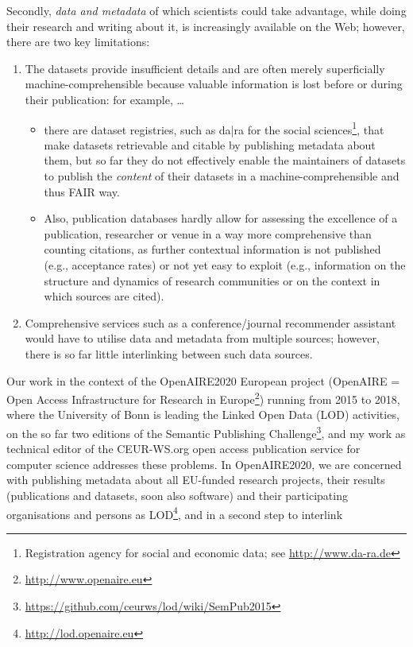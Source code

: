 \documentclass[a4paper,UKenglish]{dagrep}
\begin{document}
Secondly, \emph{data and metadata} of which scientists could take advantage,
while doing their research and writing about it, is increasingly available on
the Web; however, there are two key limitations:
\begin{enumerate}
\item The datasets provide insufficient details and are often merely
superficially machine-comprehensible because valuable information is lost before
or during their publication: for example, …
  \begin{itemize}
  \item there are dataset registries, such as da|ra for the social
sciences\footnote{Registration agency for social and economic data; see
\url{http://www.da-ra.de}}, that make datasets retrievable and citable by
publishing metadata about them, but so far they do not effectively enable the
maintainers of datasets to publish the \emph{content} of their datasets in a
machine-comprehensible and thus FAIR way.
  \item Also, publication databases hardly allow for assessing the excellence of
a publication, researcher or venue in a way more comprehensive than counting
citations, as further contextual information is not published (e.g., acceptance
rates) or not yet easy to exploit (e.g., information on the structure and
dynamics of research communities or on the context in which sources are cited).
  \end{itemize}
\item Comprehensive services such as a conference/journal recommender assistant
would have to utilise data and metadata from multiple sources; however, there is
so far little interlinking between such data sources.
\end{enumerate}
Our work in the context of the OpenAIRE2020 European project (OpenAIRE = Open
Access Infrastructure for Research in
Europe\footnote{\url{http://www.openaire.eu}}) running from 2015 to 2018, where
the University of Bonn is leading the Linked Open Data (LOD) activities, on the
so far two editions of the Semantic Publishing
Challenge\footnote{\url{https://github.com/ceurws/lod/wiki/SemPub2015}}, and my
work as technical editor of the CEUR-WS.org open access publication service for
computer science addresses these problems.
In OpenAIRE2020, we are concerned with publishing metadata about all EU-funded
research projects, their results (publications and datasets, soon also software)
and their participating organisations and persons as
LOD\footnote{\url{http://lod.openaire.eu}}, and in a second step to interlink
\end{document}
